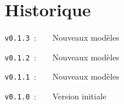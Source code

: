 \documentclass{article}
\begin{document}
\begin{PresentationCode}{}
\end{PresentationCode}

\newpage

\part{Historique}

\verb|v0.1.3|~:~~~~Nouveaux modèles

\verb|v0.1.2|~:~~~~Nouveaux modèles

\verb|v0.1.1|~:~~~~Nouveaux modèles

\verb|v0.1.0|~:~~~~Version initiale
\end{document}
